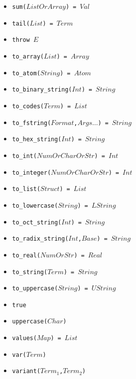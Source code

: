 \documentclass[10pt]{article}
\begin{document}
\begin{multicols}{2}
\begin{scriptsize}
\begin{itemize}
    \item \texttt{sum($ListOrArray$) = $Val$}
    \item \texttt{tail($List$) = $Term$} 
    \item \texttt{throw $E$}    
    \item \texttt{to\_array($List$) = $Array$} 
    \item \texttt{to\_atom($String$) = $Atom$} 
    \item \texttt{to\_binary\_string($Int$) = $String$}
    \item \texttt{to\_codes($Term$) = $List$}        
    \item \texttt{to\_fstring($Format$,$Args\ldots$) = $String$}
    \item \texttt{to\_hex\_string($Int$) = $String$}    
    \item \texttt{to\_int($NumOrCharOrStr$) = $Int$} 
    \item \texttt{to\_integer($NumOrCharOrStr$) = $Int$} 
    \item \texttt{to\_list($Struct$) = $List$} 
    \item \texttt{to\_lowercase($String$) = $LString$}
    \item \texttt{to\_oct\_string($Int$) = $String$}    
    \item \texttt{to\_radix\_string($Int$,$Base$) = $String$}
    \item \texttt{to\_real($NumOrStr$) = $Real$} 
    \item \texttt{to\_string($Term$) = $String$}        
    \item \texttt{to\_uppercase($String$) = $UString$}
    \item \texttt{true}
    \item \texttt{uppercase($Char$)} 
    \item \texttt{values($Map$) = $List$} 
    \item \texttt{var($Term$)} 
    \item \texttt{variant($Term_1$,$Term_2$)}

\end{itemize}
\end{scriptsize}
\end{multicols}
\end{document}
